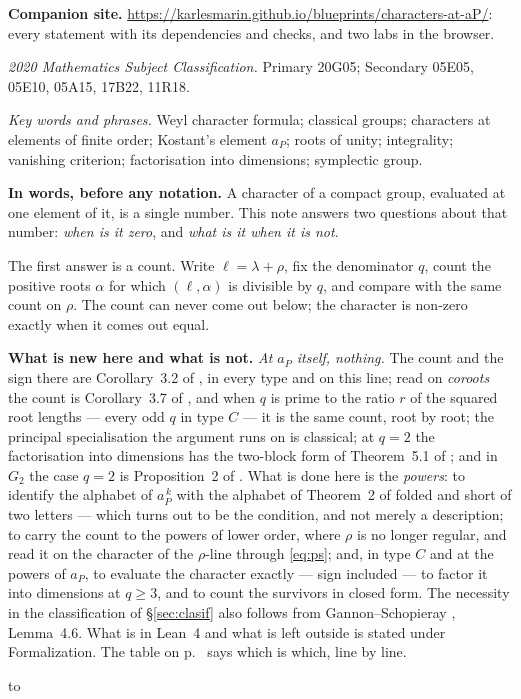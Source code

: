 \documentclass[11pt,a4paper]{article}
\theoremstyle{definition}
\newenvironment{keybox}
  {\par\vspace{9pt}\begin{lrbox}{\fichabox}%
   \begin{minipage}{0.90\textwidth}\vspace{7pt}\setlength{\parskip}{3pt}}
  {\vspace{7pt}\end{minipage}\end{lrbox}%
   \par\noindent\hbox to \textwidth{\hfill
   \textcolor{azul}{\rule[-\dp\fichabox]{3.2pt}{\dimexpr\ht\fichabox+\dp\fichabox\relax}}%
   \colorbox{fondoficha}{\usebox{\fichabox}}\hfill}%
   \par\vspace{9pt}}
\begin{document}
\noindent\textbf{Companion site.} \url{https://karlesmarin.github.io/blueprints/characters-at-aP/}: every statement with its dependencies and checks, and two labs in the browser.

\begin{center}\small
\emph{2020 Mathematics Subject Classification.}\;
Primary 20G05; Secondary 05E05, 05E10, 05A15, 17B22, 11R18.

\smallskip
\emph{Key words and phrases.}\;
Weyl character formula; classical groups; characters at elements of finite order; Kostant's element
$a_P$; roots of unity; integrality; vanishing criterion; factorisation into dimensions; symplectic
group.
\end{center}

\begin{keybox}
\textbf{In words, before any notation.} A character of a compact group, evaluated at one element of
it, is a single number. This note answers two questions about that number: \emph{when is it zero},
and \emph{what is it when it is not}.

\smallskip
The first answer is a count. Write $\ell=\lambda+\rho$, fix the denominator $q$, count the positive roots
$\alpha$ for which $(\ell,\alpha)$ is divisible by $q$, and compare with the same count on $\rho$.
The count can never come out below; the character is non-zero exactly when it comes out equal.

\smallskip
\textbf{What is new here and what is not.} \emph{At $a_P$ itself, nothing.} The count and the sign
there are Corollary~3.2 of \cite{CMP06}, in every type and on this line; read on \emph{coroots} the
count is Corollary~3.7 of \cite{NPP25}, and when $q$ is prime to the ratio $r$ of the squared root
lengths --- every odd $q$ in type $C$ --- it is the same count, root by root; the principal
specialisation the argument runs on is classical; at $q=2$ the factorisation into dimensions has
the two-block form of Theorem~5.1 of \cite{Kar24}; and in $G_2$ the case $q=2$ is Proposition~2 of
\cite{Kar24}. What is done here is the \emph{powers}: to identify the alphabet of $a_P^{\,k}$ with
the alphabet of Theorem~2 of \cite{Prasad16b} folded and short of two letters --- which turns out to
be the condition, and not merely a description; to carry the count to the powers of lower order,
where $\rho$ is no longer regular, and read it on the character of the $\rho$-line through
\eqref{eq:ps}; and, in type $C$ and at the powers of $a_P$, to evaluate the character exactly ---
sign included --- to factor it into dimensions at $q\ge3$, and to count the survivors in closed
form. The necessity in the classification of \S\ref{sec:clasif} also follows from
Gannon--Schopieray \cite{GS19}, Lemma~4.6. What is in Lean~4 and what
is left outside is stated under Formalization. The table on
p.~\pageref{tab:attrib} says which is which, line by line.
\end{keybox}
\end{document}

